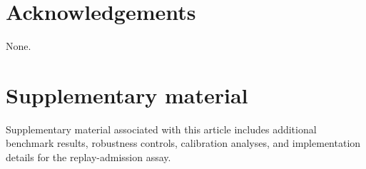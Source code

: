 \documentclass[preprint,12pt]{elsarticle}
\begin{document}
\section*{Acknowledgements}

None.

\section*{Supplementary material}

Supplementary material associated with this article includes additional benchmark results, robustness controls, calibration analyses, and implementation details for the replay-admission assay.

\begingroup
\sloppy


\endgroup
\end{document}
